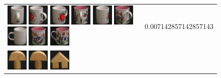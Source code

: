 \begin{figure}[tbp]
\begin{center}
\begin{tabular}{m{11cm} | m{3cm} |}
\includegraphics[width=1cm]{coil/beeld-41.eps}
\includegraphics[width=1cm]{coil/beeld-40.eps}
\includegraphics[width=1cm]{coil/beeld-39.eps}
\includegraphics[width=1cm]{coil/beeld-11.eps}
\includegraphics[width=1cm]{coil/beeld-38.eps}
\includegraphics[width=1cm]{coil/beeld-10.eps}
\includegraphics[width=1cm]{coil/beeld-37.eps}
\includegraphics[width=1cm]{coil/beeld-8.eps}
\includegraphics[width=1cm]{coil/beeld-7.eps}
& {\scriptsize 0.007142857142857143}
\\
\includegraphics[width=1cm]{coil/beeld-0.eps}
\includegraphics[width=1cm]{coil/beeld-1.eps}
\includegraphics[width=1cm]{coil/beeld-42.eps}

\end{tabular}
\end{center}
\end{figure}
